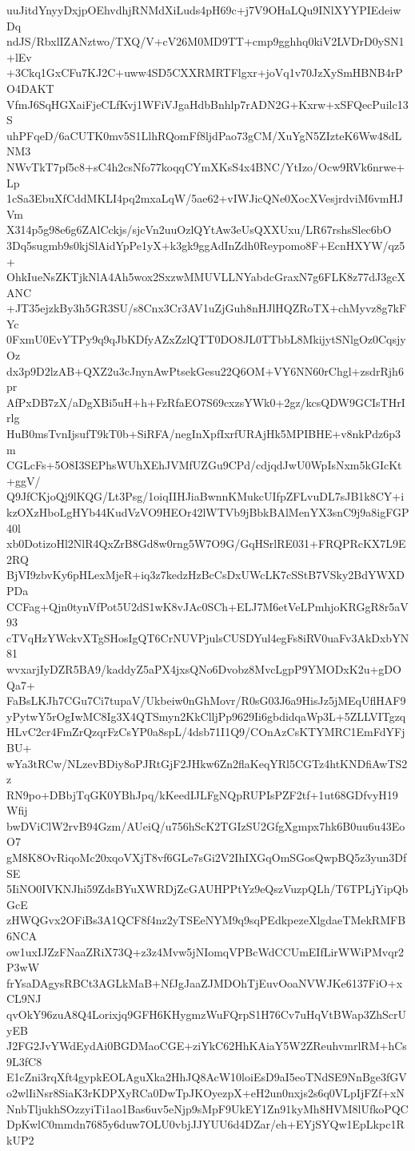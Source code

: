uuJitdYnyyDxjpOEhvdhjRNMdXiLuds4pH69c+j7V9OHaLQu9INlXYYPIEdeiwDq
ndJS/RbxlIZANztwo/TXQ/V+cV26M0MD9TT+cmp9gghhq0kiV2LVDrD0ySN1+lEv
+3Ckq1GxCFu7KJ2C+uww4SD5CXXRMRTFlgxr+joVq1v70JzXySmHBNB4rPO4DAKT
VfmJ6SqHGXaiFjeCLfKvj1WFiVJgaHdbBnhlp7rADN2G+Kxrw+xSFQecPuilc13S
uhPFqeD/6aCUTK0mv5S1LlhRQomFf8ljdPao73gCM/XuYgN5ZIzteK6Ww48dLNM3
NWvTkT7pf5c8+sC4h2csNfo77koqqCYmXKsS4x4BNC/YtIzo/Ocw9RVk6nrwe+Lp
1cSa3EbuXfCddMKLI4pq2mxaLqW/5ae62+vIWJicQNe0XocXVesjrdviM6vmHJVm
X314p5g98e6g6ZAlCckjs/sjcVn2uuOzlQYtAw3eUsQXXUxu/LR67rshsSlec6bO
3Dq5sugmb9s0kjSlAidYpPe1yX+k3gk9ggAdInZdh0Reypomo8F+EcnHXYW/qz5+
OhkIueNsZKTjkNlA4Ah5wox2SxzwMMUVLLNYabdcGraxN7g6FLK8z77dJ3gcXANC
+JT35ejzkBy3h5GR3SU/s8Cnx3Cr3AV1uZjGuh8nHJlHQZRoTX+chMyvz8g7kFYc
0FxmU0EvYTPy9q9qJbKDfyAZxZzlQTT0DO8JL0TTbbL8MkijytSNlgOz0CqsjyOz
dx3p9D2lzAB+QXZ2u3cJnynAwPtsekGesu22Q6OM+VY6NN60rChgl+zsdrRjh6pr
AfPxDB7zX/aDgXBi5uH+h+FzRfaEO7S69cxzsYWk0+2gz/kcsQDW9GCIsTHrIrlg
HuB0msTvnIjsufT9kT0b+SiRFA/negInXpfIxrfURAjHk5MPIBHE+v8nkPdz6p3m
CGLcFs+5O8I3SEPhsWUhXEhJVMfUZGu9CPd/cdjqdJwU0WpIsNxm5kGIcKt+ggV/
Q9JfCKjoQj9lKQG/Lt3Psg/1oiqIIHJiaBwnnKMukcUIfpZFLvuDL7sJB1k8CY+i
kzOXzHboLgHYb44KudVzVO9HEOr42lWTVb9jBbkBAlMenYX3snC9j9a8igFGP40l
xb0DotizoHl2NlR4QxZrB8Gd8w0rng5W7O9G/GqHSrlRE031+FRQPRcKX7L9E2RQ
BjVI9zbvKy6pHLexMjeR+iq3z7kedzHzBcCsDxUWcLK7cSStB7VSky2BdYWXDPDa
CCFag+Qjn0tynVfPot5U2dS1wK8vJAc0SCh+ELJ7M6etVeLPmhjoKRGgR8r5aV93
cTVqHzYWckvXTgSHosIgQT6CrNUVPjulsCUSDYul4egFs8iRV0uaFv3AkDxbYN81
wvxarjIyDZR5BA9/kaddyZ5aPX4jxsQNo6Dvobz8MvcLgpP9YMODxK2u+gDOQa7+
FaBsLKJh7CGu7Ci7tupaV/Ukbeiw0nGhMovr/R0sG03J6a9HisJz5jMEqUflHAF9
yPytwY5rOgIwMC8Ig3X4QTSmyn2KkClljPp9629Ii6gbdidqaWp3L+5ZLLVITgzq
HLvC2cr4FmZrQzqrFzCsYP0a8spL/4dsb71I1Q9/COnAzCsKTYMRC1EmFdYFjBU+
wYa3tRCw/NLzevBDiy8oPJRtGjF2JHkw6Zn2flaKeqYRl5CGTz4htKNDfiAwTS2z
RN9po+DBbjTqGK0YBhJpq/kKeedIJLFgNQpRUPIsPZF2tf+1ut68GDfvyH19Wfij
bwDViClW2rvB94Gzm/AUeiQ/u756hScK2TGIzSU2GfgXgmpx7hk6B0uu6u43EoO7
gM8K8OvRiqoMc20xqoVXjT8vf6GLe7sGi2V2IhIXGqOmSGosQwpBQ5z3yun3DfSE
5IiNO0IVKNJhi59ZdsBYuXWRDjZcGAUHPPtYz9eQszVuzpQLh/T6TPLjYipQbGcE
zHWQGvx2OFiBs3A1QCF8f4nz2yTSEeNYM9q9sqPEdkpezeXlgdaeTMekRMFB6NCA
ow1uxIJZzFNaaZRiX73Q+z3z4Mvw5jNIomqVPBcWdCCUmEIfLirWWiPMvqr2P3wW
frYsaDAgysRBCt3AGLkMaB+NfJgJaaZJMDOhTjEuvOoaNVWJKe6137FiO+xCL9NJ
qvOkY96zuA8Q4Lorixjq9GFH6KHygmzWuFQrpS1H76Cv7uHqVtBWap3ZhScrUyEB
J2FG2JvYWdEydAi0BGDMaoCGE+ziYkC62HhKAiaY5W2ZReuhvmrlRM+hCs9L3fC8
E1cZni3rqXft4gypkEOLAguXka2HhJQ8AcW10loiEsD9aI5eoTNdSE9NnBge3fGV
o2wlIiNsr8SiaK3rKDPXyRCa0DwTpJKOyezpX+eH2un0nxjs2s6q0VLpIjFZf+xN
NnbTljukhSOzzyiTi1ao1Bas6uv5eNjp9sMpF9UkEY1Zn91kyMh8HVM8lUfkoPQC
DpKwlC0mmdn7685y6duw7OLU0vbjJJYUU6d4DZar/eh+EYjSYQw1EpLkpc1RkUP2
